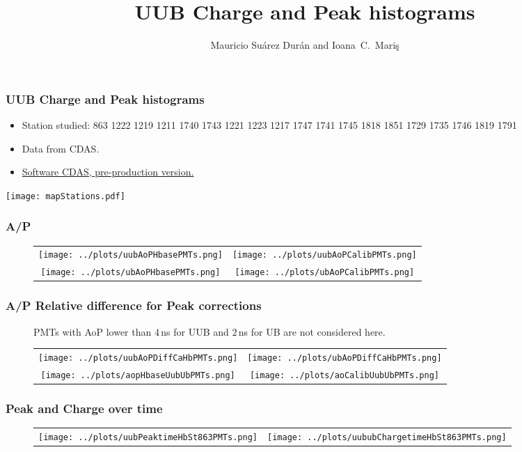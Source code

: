 \documentclass[aspectratio=169]{beamer}
\title{UUB Charge and Peak histograms}
\author{
  Mauricio Su\'arez Dur\'an and Ioana~C.~Mari\c{s}
}
\institute{IIHE-ULB}
\begin{document}
\begin{frame}
  \titlepage
\end{frame}


\begin{frame}
	\frametitle{UUB Charge and Peak histograms}
	\begin{itemize}
		\item Station studied: 863 1222 1219 1211 1740 1743 1221 1223 1217 1747 1741 1745 1818 1851 1729 1735 1746 1819 1791
		\item Data from CDAS.
		\item {\underline {Software CDAS, pre-production version.}}
	\end{itemize}
	\centering
	\texttt{[image: mapStations.pdf]}
\end{frame}


\begin{frame}
  \frametitle{A/P}
  \begin{figure}
    \centering
    \begin{tabularx}{\textwidth}{CC}
      \texttt{[image: ../plots/uubAoPHbasePMTs.png]}
      &
      \texttt{[image: ../plots/uubAoPCalibPMTs.png]}
      \\
      \texttt{[image: ../plots/ubAoPHbasePMTs.png]}
      &
      \texttt{[image: ../plots/ubAoPCalibPMTs.png]}
    \end{tabularx}
  \end{figure}
  \centering
  
\end{frame}


\begin{frame}
  \frametitle{A/P Relative difference for Peak corrections}
  \begin{figure}
    PMTs with AoP lower than $4$\,ns for UUB and $2$\,ns for UB are not considered here.
    \centering
    \begin{tabularx}{\textwidth}{CC}
      \texttt{[image: ../plots/uubAoPDiffCaHbPMTs.png]}
      &
      \texttt{[image: ../plots/ubAoPDiffCaHbPMTs.png]}
      \\
      \texttt{[image: ../plots/aopHbaseUubUbPMTs.png]}
      &
      \texttt{[image: ../plots/aoCalibUubUbPMTs.png]}
    \end{tabularx}
  \end{figure}
\end{frame}


\begin{frame}
	\frametitle{Peak and Charge over time}
  \begin{figure}
  \centering
    \begin{tabularx}{\textwidth}{CC}
      \texttt{[image: ../plots/uubPeaktimeHbSt863PMTs.png]}
      &
      \texttt{[image: ../plots/uububChargetimeHbSt863PMTs.png]}
    \end{tabularx}
  \end{figure}
\end{frame}
\end{document}

